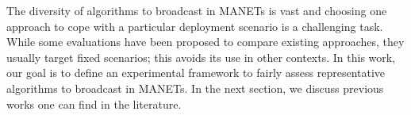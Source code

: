 The diversity of algorithms to broadcast in MANETs is vast and choosing one approach to cope with a particular deployment scenario is a challenging task.
%
While some evaluations have been proposed to compare existing approaches, they usually target fixed scenarios; this avoids its use in other contexts.
%
In this work, our goal is to define an experimental framework to fairly assess representative algorithms  to broadcast in MANETs. 
%
In the next section, we discuss previous works one can find in the literature.
